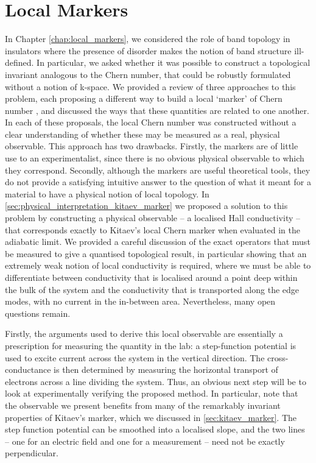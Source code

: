 \section{Local Markers}

In Chapter \ref{chap:local_markers}, we considered the role of band topology in insulators where the presence of disorder makes the notion of band structure ill-defined. In particular, we asked whether it was possible to construct a topological invariant analogous to the Chern number, that could be robustly formulated without a notion of k-space. We provided a review of three approaches to this problem, each proposing a different way to build a local `marker' of Chern number \cite{bianco_mapping_2011,loring_guide_2019,kitaev_anyons_2006}, and discussed the ways that these quantities are related to one another. In each of these proposals, the local Chern number was constructed without a clear understanding of whether these may be measured as a real, physical observable. This approach has two drawbacks. Firstly, the markers are of little use to an experimentalist, since there is no obvious physical observable to which they correspond. Secondly, although the markers are useful theoretical tools, they do not provide a satisfying intuitive answer to the question of what it meant for a material to have a physical notion of local topology. In \textsection\ref{sec:physical_interpretation_kitaev_marker} we proposed a solution to this problem by constructing a physical observable -- a localised Hall conductivity -- that corresponds exactly to Kitaev's local Chern marker \cite{kitaev_anyons_2006} when evaluated in the adiabatic limit. We provided a careful discussion of the exact operators that must be measured to give a quantised topological result, in particular showing that an extremely weak notion of local conductivity is required, where we must be able to differentiate between conductivity that is localised around a point deep within the bulk of the system and the conductivity that is transported along the edge modes, with no current in the in-between area. Nevertheless, many open questions remain.

Firstly, the arguments used to derive this local observable are essentially a prescription for measuring the quantity in the lab: a step-function potential is used to excite current across the system in the vertical direction. The cross-conductance is then determined by measuring the horizontal transport of electrons across a line dividing the system. Thus, an obvious next step will be to look at experimentally verifying the proposed method. In particular, note that the observable we present benefits from many of the remarkably invariant properties of Kitaev's marker, which we discussed in \textsection\ref{sec:kitaev_marker}. The step function potential can be smoothed into a localised slope, and the two lines -- one for an electric field and one for a measurement -- need not be exactly perpendicular.

